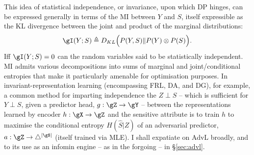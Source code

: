 This idea of statistical independence, or invariance, upon which \ac{DP} hinges, can be expressed
generally in terms of the \acf{MI} between \(Y\) and \(S\), itself expressible as the KL divergence
between the joint and product of the marginal distributions:
%
\begin{equation}
    \gI(Y;S) \triangleq D_{KL} \Bigl( P(Y, S) \Vert P(Y) \otimes P(S) \Bigr).
\end{equation}
%
Iff \( \gI(Y;S) = 0  \) can the random variables said to be statistically independent.
%
%
\ac{MI} admits various decompositions into sums of marginal and joint/conditional entropies that
make it particularly amenable for optimisation purposes. 
%
In invariant-representation learning (encompassing \ac{FRL}, \ac{DA}, and \ac{DG}), for example, a
common method for imparting independence the \(Z \perp S \) -- which is sufficient for \(Y \perp
S\), given a predictor head, \(g: \gZ \to \gY \) -- between the representations learned by encoder
\(h: \gX \to \gZ \) and the sensitive attribute is to train \(h\) to maximise the conditional
entropy \( H(\hat{S}|Z) \) of an adversarial predictor, \(a: \gZ \to \bigtriangleup^{|\gS|}\)
(itself trained via \ac{MLE}). %
%
I shall expatiate on \ac{AdvL} broadly, and \wrt{} to its use as an infomin engine -- as in the
forgoing -- in \S\ref{sec:advl}.

